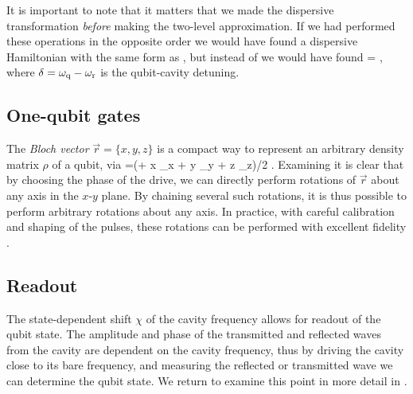 It is important to note that it matters that we made the dispersive transformation \emph{before} making the two-level approximation. If we had performed these operations in the opposite order we would have found a dispersive Hamiltonian with the same form as , but instead of  we would have found
\be
    \label{eq:chicpb}
    \chi= ,
\ee
where $\delta=\omega_\text{q}-\omega_{\text{r}}$ is the qubit-cavity detuning.

\subsection{One-qubit gates}
\label{sec:oneqgates}
The \emph{Bloch vector} $\vec{r}=\{x,y,z\}$ is a compact way to represent an arbitrary density matrix $\rho$ of a qubit, via
\be
    \label{eq:blochvector}
    \rho=(\openone + x \sigma_x + y \sigma_y + z \sigma_z)/2 .
\ee%
%
Examining  it is clear that by choosing the phase of the drive, we can directly perform rotations of $\vec{r}$ about any axis in the $x$-$y$ plane. By chaining several such rotations, it is thus possible to perform arbitrary rotations about any axis. In practice, with careful calibration and shaping of the pulses, these rotations can be performed with excellent fidelity \cite{chow_2009}.

\subsection{Readout}
\label{sec:readout}
The state-dependent shift $\chi$ of the cavity frequency allows for readout of the qubit state. The amplitude and phase of the transmitted and reflected waves from the cavity are dependent on the cavity frequency, thus by driving the cavity close to its bare frequency, and measuring the reflected or transmitted wave we can determine the qubit state. We return to examine this point in more detail in .
